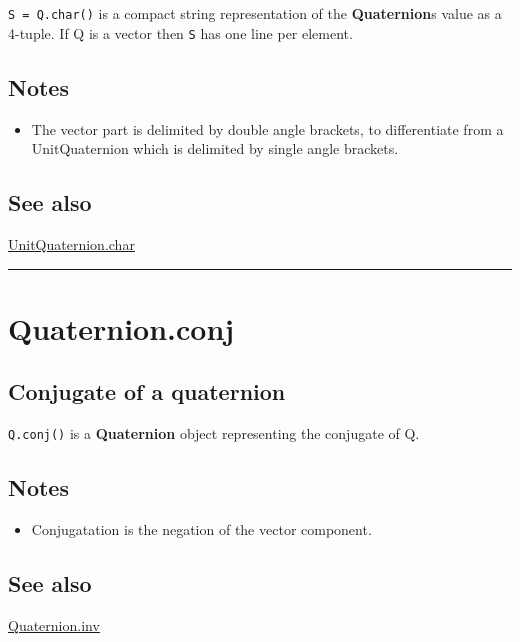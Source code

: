 \texttt{S = Q.char()} is a compact string representation of the \textbf{\color{red} Quaternion}\textquotesingle s value
as a 4-tuple.  If Q is a vector then \texttt{S} has one line per element.


\subsection*{Notes}
\begin{itemize}
  \item The vector part is delimited by double angle brackets, to differentiate    from a UnitQuaternion which is delimited by single angle brackets.
\end{itemize}

\subsection*{See also}


\hyperlink{UnitQuaternion.char}{\color{blue} UnitQuaternion.char}

\vspace{1.5ex}\hrule

\hypertarget{Quaternion.conj}{\section*{Quaternion.conj}}
\subsection*{Conjugate of a quaternion}


\texttt{Q.conj()} is a \textbf{\color{red} Quaternion} object representing the conjugate of Q.


\subsection*{Notes}
\begin{itemize}
  \item Conjugatation is the negation of the vector component.
\end{itemize}

\subsection*{See also}


\hyperlink{Quaternion.inv}{\color{blue} Quaternion.inv}

